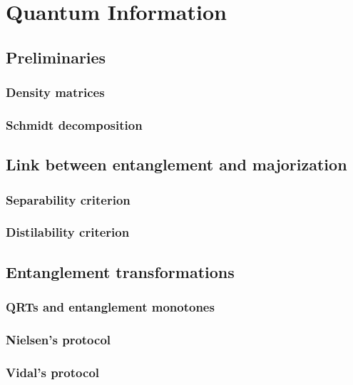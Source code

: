 \chapter{Quantum Information}

\section{Preliminaries}

\subsection{Density matrices}



\subsection{Schmidt decomposition}



\section{Link between entanglement and majorization}

\subsection{Separability criterion}



\subsection{Distilability criterion}



\section{Entanglement transformations}

\subsection{QRTs and entanglement monotones} \label{sec:QRT}

\subsection{Nielsen's protocol} \label{sec:nielsen}



\subsection{Vidal's protocol}

